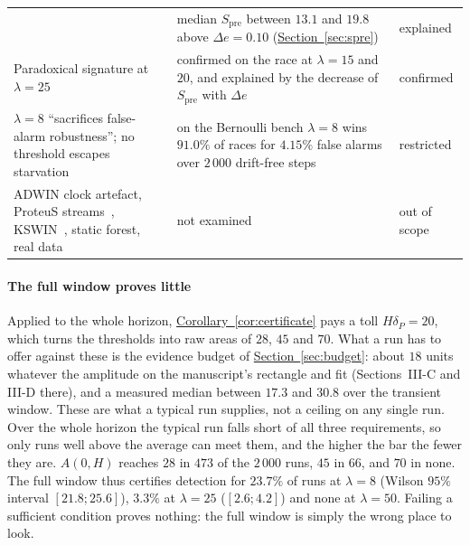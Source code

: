 \documentclass[10pt,conference]{IEEEtran}
\theoremstyle{definition}
\begin{document}
\begin{table}[t]
\begin{tabular}{@{}p{}p{}p{}@{}}
  & median $S_{\mathrm{pre}}$ between $13.1$ and $19.8$ above $\Delta e = 0.10$
    (\hyperref[sec:spre]{Section~\ref*{sec:spre}}) & explained \\
Paradoxical signature at $\lambda = 25$
  & confirmed on the race at $\lambda = 15$ and $20$, and explained by the decrease of
    $S_{\mathrm{pre}}$ with $\Delta e$ & confirmed \\
$\lambda = 8$ ``sacrifices false-alarm robustness''; no threshold escapes starvation
  & on the Bernoulli bench $\lambda = 8$ wins $91.0\%$ of races for $4.15\%$ false alarms
    over $2\,000$ drift-free steps & restricted \\
ADWIN clock artefact, ProteuS streams~\cite{suarez2025}, KSWIN~\cite{raab2020}, static
  forest, real data & not examined & out of scope \\
\bottomrule
\end{tabular}
\end{table}

\paragraph{The full window proves little} Applied to the whole horizon,
\hyperref[cor:certificate]{Corollary~\ref*{cor:certificate}} pays a toll $H\delta_P = 20$, which turns the thresholds into
raw areas of $28$, $45$ and $70$. What a run has to offer against these is the
evidence budget of \hyperref[sec:budget]{Section~\ref*{sec:budget}}: about $18$ units whatever the amplitude on the
manuscript's rectangle and fit (Sections~III-C and III-D there), and a measured median
between $17.3$ and $30.8$ over the transient window. These are what a typical run supplies,
not a ceiling on any single run. Over the whole horizon the typical run falls short of all
three requirements, so only runs well above the average can meet them, and the higher the
bar the fewer they are. $A(0,H)$ reaches $28$ in $473$ of the $2\,000$
runs, $45$ in $66$, and $70$ in none. The full window thus certifies detection for
$23.7\%$ of runs at $\lambda = 8$ (Wilson $95\%$ interval $[21.8;25.6]$), $3.3\%$ at
$\lambda = 25$ ($[2.6;4.2]$) and none at $\lambda = 50$. Failing a sufficient condition
proves nothing: the full window is simply the wrong place to look.
\end{document}
